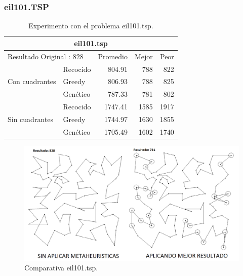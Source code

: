 \subsubsection{eil101.TSP}
\begin{table}[hbtp]
 \centering
     \caption{Experimento con el problema eil101.tsp.}
\begin{tabular}{ | l   l | r | r | r |   }
	    \hline\multicolumn{5}{|c|}{ \rowcolor[gray]{0.8} eil101.tsp} \\ \hline
         \multicolumn{2}{|l|}{Resultado Original : 828}   & Promedio & Mejor & Peor \\ 
                \hline
                & Recocido  & 804.91 & 788 & 822  \\ 
 Con cuadrantes & Greedy    & 806.93 & 788 & 825  \\ 
                & Genético  & \cellcolor[gray]{0.9} 787.33 & \cellcolor[gray]{0.9} 781 & \cellcolor[gray]{0.9} 802  \\ 
                \hline
                & Recocido  & 1747.41 & \cellcolor[gray]{0.9} 1585 & 1917   \\ 
 Sin cuadrantes & Greedy    & 1744.97 & 1630 & 1855   \\ 
                & Genético  & \cellcolor[gray]{0.9} 1705.49 & 1602 & \cellcolor[gray]{0.9} 1740    \\ 
                \hline
    \end{tabular}
    \label{table:EXP_eil101.tsp}
\end{table}
 \begin{figure}[hbtp]
    \centering
        \includegraphics[width=1\textwidth]{PruebasResultados/Experimentos_Comparativas/eil101.png}
        \caption{Comparativa eil101.tsp.}
        \label{fig:eil101_comparativa.png}
\end{figure}

